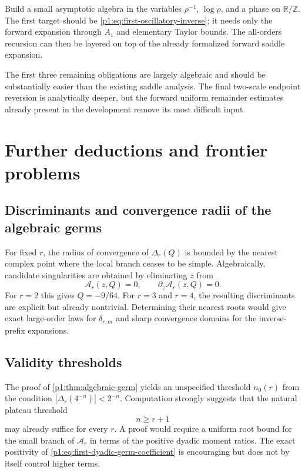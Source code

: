\documentclass[11pt,oneside]{article}
\numberwithin{equation}{section}
\theoremstyle{definition}
\theoremstyle{remark}
\newcommand{\R}{\mathbb R}
\newcommand{\Z}{\mathbb Z}
\begin{document}
\begin{obligation}
Build a small asymptotic algebra in the variables $\rho^{-1}$, $\log\rho$, and a phase on
$\R/\Z$.  The first target should be \eqref{p1:eq:first-oscillatory-inverse}; it needs only the
forward expansion through $A_1$ and elementary Taylor bounds.  The all-orders recursion can
then be layered on top of the already formalized forward saddle expansion.
\end{obligation}

The first three remaining obligations are largely algebraic and should be substantially easier
than the existing saddle analysis.  The final two-scale endpoint reversion is analytically
deeper, but the forward uniform remainder estimates already present in the development remove
its most difficult input.

\section{Further deductions and frontier problems}
\label{p1:sec:frontier-problems}

\subsection{Discriminants and convergence radii of the algebraic germs}

For fixed $r$, the radius of convergence of $\Delta_r(Q)$ is bounded by the nearest complex
point where the local branch ceases to be simple.  Algebraically, candidate singularities are
obtained by eliminating $z$ from
\begin{equation}
 \mathcal A_r(z,Q)=0,
 \qquad
 \partial_z\mathcal A_r(z,Q)=0.
 \label{p1:eq:discriminant-system}
\end{equation}
For $r=2$ this gives $Q=-9/64$.  For $r=3$ and $r=4$, the resulting discriminants are
explicit but already nontrivial.  Determining their nearest roots would give exact
large-order laws for $\delta_{r,m}$ and sharp convergence domains for the inverse-prefix
expansions.

\subsection{Validity thresholds}

The proof of \cref{p1:thm:algebraic-germ} yields an unspecified threshold $n_0(r)$ from the
condition $|\Delta_r(4^{-n})|<2^{-n}$.  Computation strongly suggests that the natural
plateau threshold
\begin{equation}
 n\ge r+1
 \label{p1:eq:natural-threshold-conjecture}
\end{equation}
may already suffice for every $r$.  A proof would require a uniform root bound for the small
branch of $\mathcal A_r$ in terms of the positive dyadic moment ratios.  The exact positivity
of \eqref{p1:eq:first-dyadic-germ-coefficient} is encouraging but does not by itself control
higher terms.
\end{document}
